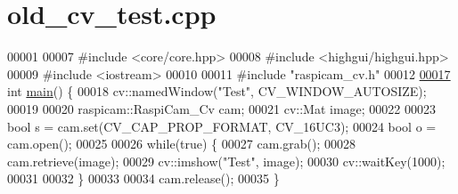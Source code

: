\hypertarget{old__cv__test_8cpp_source}{\section{old\+\_\+cv\+\_\+test.\+cpp}
\label{old__cv__test_8cpp_source}
}

\begin{DoxyCode}
00001 
00007 \textcolor{preprocessor}{#include <core/core.hpp>}
00008 \textcolor{preprocessor}{#include <highgui/highgui.hpp>}
00009 \textcolor{preprocessor}{#include <iostream>}
00010 
00011 \textcolor{preprocessor}{#include "raspicam\_cv.h"}
00012 
\hypertarget{old__cv__test_8cpp_source_l00017}{}\hyperlink{old__cv__test_8cpp_ae66f6b31b5ad750f1fe042a706a4e3d4}{00017} \textcolor{keywordtype}{int} \hyperlink{old__cv__test_8cpp_ae66f6b31b5ad750f1fe042a706a4e3d4}{main}() \{
00018     cv::namedWindow(\textcolor{stringliteral}{"Test"}, CV\_WINDOW\_AUTOSIZE);
00019 
00020     raspicam::RaspiCam\_Cv cam;
00021     cv::Mat image;
00022 
00023     \textcolor{keywordtype}{bool} s = cam.set(CV\_CAP\_PROP\_FORMAT, CV\_16UC3);
00024     \textcolor{keywordtype}{bool} o = cam.open();
00025 
00026     \textcolor{keywordflow}{while}(\textcolor{keyword}{true}) \{
00027         cam.grab();
00028         cam.retrieve(image);
00029         cv::imshow(\textcolor{stringliteral}{"Test"}, image);
00030         cv::waitKey(1000);
00031 
00032     \}
00033 
00034     cam.release();
00035 \}
\end{DoxyCode}
